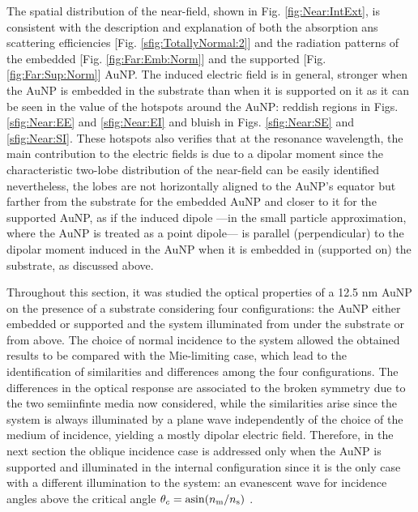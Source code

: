 The spatial distribution of the near-field, shown in Fig. \ref{fig:Near:IntExt}, is consistent with the description and explanation of both the absorption ans scattering efficiencies [Fig. \ref{sfig:TotallyNormal:2}] and the radiation patterns of the embedded [Fig. \ref{fig:Far:Emb:Norm}] and the supported [Fig. \ref{fig:Far:Sup:Norm}] AuNP. The induced electric field is in general, stronger when the AuNP is embedded in the substrate than when it is supported on it as it can be seen in the value of the hotspots around the AuNP: reddish regions in Figs. \ref{sfig:Near:EE} and \ref{sfig:Near:EI} and bluish in Figs. \ref{sfig:Near:SE} and \ref{sfig:Near:SI}. These hotspots also verifies that at the resonance wavelength, the main contribution to the electric fields is due to a dipolar moment since the characteristic two-lobe distribution of the near-field can be easily identified nevertheless, the lobes are not horizontally aligned to the AuNP's equator but farther from the substrate for the embedded AuNP and closer to it for the supported AuNP, as if the induced dipole ---in the small particle approximation, where the AuNP is treated as a point dipole--- is parallel (perpendicular) to the dipolar moment induced in the AuNP when it is embedded in (supported on) the substrate, as discussed above.

Throughout this section, it was studied the optical properties of a 12.5 nm AuNP on the presence of a substrate considering four configurations: the AuNP either embedded or supported and the system illuminated from under the substrate or from above. The choice of normal incidence to the system allowed the obtained results to be compared with the Mie-limiting case, which lead to the identification of similarities and differences among the four configurations. The differences in the optical response are associated to the broken symmetry due to the two semiinfinte media now considered, while the similarities arise since the system is always illuminated by a plane wave independently of the choice of the medium of incidence, yielding a mostly dipolar electric field. Therefore, in the next section the oblique incidence case is addressed only when the AuNP is supported and illuminated in the internal configuration since it is the only case with a different illumination to the system: an evanescent wave for incidence angles above the critical angle $\theta_c =\asin(n_\text{m}/n_\text{s})$ \cite{born_max_principle_1999}.
